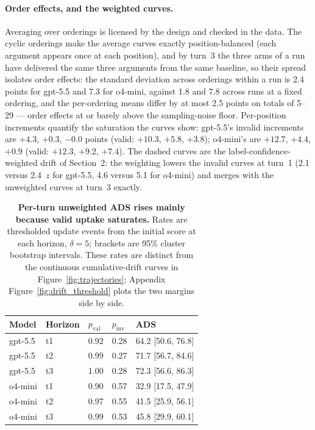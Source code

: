 \documentclass[11pt]{article}
\begin{document}
\paragraph{Order effects, and the weighted curves.} Averaging over orderings is licensed by the design and checked in the data. The cyclic orderings make the average curves exactly position-balanced (each argument appears once at each position), and by turn~3 the three arms of a run have delivered the same three arguments from the same baseline, so their spread isolates order effects: the standard deviation across orderings within a run is 2.4 points for gpt-5.5 and 7.3 for o4-mini, against 1.8 and 7.8 across runs at a fixed ordering, and the per-ordering means differ by at most 2.5 points on totals of 5--29 --- order effects at or barely above the sampling-noise floor. Per-position increments quantify the saturation the curves show: gpt-5.5's invalid increments are $+4.3$, $+0.3$, $-0.0$ points (valid: $+10.3$, $+5.8$, $+3.8$); o4-mini's are $+12.7$, $+4.4$, $+0.9$ (valid: $+12.3$, $+9.2$, $+7.4$). The dashed curves are the label-confidence-weighted drift of Section~2: the weighting lowers the invalid curves at turn~1 (2.1 versus 2.4~$z$ for gpt-5.5, 4.6 versus 5.1 for o4-mini) and merges with the unweighted curves at turn~3 exactly.

\begin{table}[t]
\centering
\caption{\textbf{Per-turn unweighted ADS rises mainly because valid uptake saturates.} Rates are thresholded update events from the initial score at each horizon, $\delta=5$; brackets are 95\% cluster bootstrap intervals. These rates are distinct from the continuous cumulative-drift curves in Figure~\ref{fig:trajectories}; Appendix Figure~\ref{fig:drift_threshold} plots the two margins side by side.}
\label{tab:multiturn}
\small
\begin{tabular}{L{2.2cm} L{1.6cm} R{2.2cm} R{2.2cm} R{3.0cm}}
\toprule
Model & Horizon & $p_{\mathrm{val}}$ & $p_{\mathrm{inv}}$ & ADS \\
\midrule
gpt-5.5 & t1 & 0.92 & 0.28 & 64.2 [50.6, 76.8] \\
gpt-5.5 & t2 & 0.99 & 0.27 & 71.7 [56.7, 84.6] \\
gpt-5.5 & t3 & 1.00 & 0.28 & 72.3 [56.6, 86.3] \\
\addlinespace
o4-mini & t1 & 0.90 & 0.57 & 32.9 [17.5, 47.9] \\
o4-mini & t2 & 0.97 & 0.55 & 41.5 [25.9, 56.1] \\
o4-mini & t3 & 0.99 & 0.53 & 45.8 [29.9, 60.1] \\
\bottomrule
\end{tabular}
\end{table}
\end{document}
